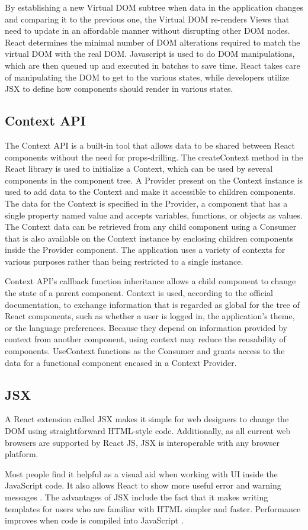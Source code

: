 By establishing a new Virtual DOM subtree when data in the application changes and comparing it to the previous one, the Virtual DOM re-renders Views that need to update in an affordable manner without disrupting other DOM nodes. React determines the minimal number of DOM alterations required to match the virtual DOM with the real DOM. Javascript is used to do DOM manipulations, which are then queued up and executed in batches to save time. React takes care of manipulating the DOM to get to the various states, while developers utilize JSX to define how components should render in various states.

\subsection{Context API}

The Context API is a built-in tool that allows data to be shared between React components without the need for props-drilling. The createContext method in the React library is used to initialize a Context, which can be used by several components in the component tree. A Provider present on the Context instance is used to add data to the Context and make it accessible to children components. The data for the Context is specified in the Provider, a component that has a single property named value and accepts variables, functions, or objects as values. The Context data can be retrieved from any child component using a Consumer that is also available on the Context instance by enclosing children components inside the Provider component. The application uses a variety of contexts for various purposes rather than being restricted to a single instance.

Context API's callback function inheritance allows a child component to change the state of a parent component. Context is used, according to the official documentation, to exchange information that is regarded as global for the tree of React components, such as whether a user is logged in, the application's theme, or the language preferences. Because they depend on information provided by context from another component, using context may reduce the reusability of components. UseContext functions as the Consumer and grants access to the data for a functional component encased in a Context Provider.

\subsection{JSX}

A React extension called JSX makes it simple for web designers to change the DOM using straightforward HTML-style code. Additionally, as all current web browsers are supported by React JS, JSX is interoperable with any browser platform.

Most people find it helpful as a visual aid when working with UI inside the JavaScript code. It also allows React to show more useful error and warning messages \autocite{react2020introducing}. The advantages of JSX include the fact that it makes writing templates for users who are familiar with HTML simpler and faster. Performance improves when code is compiled into JavaScript \autocite{phan2020react}.
